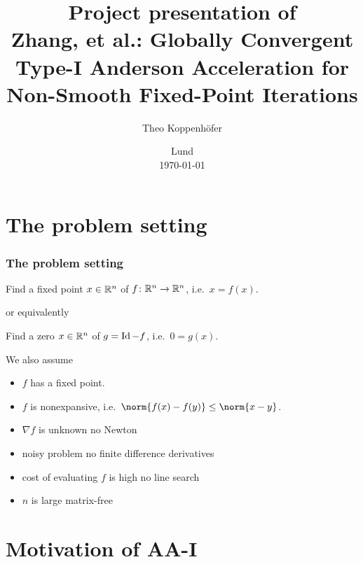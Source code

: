 %




\subject{, VT23}
\title{Project presentation of \\[1ex]
{\large Zhang, et al.: Globally Convergent Type-I Anderson Acceleration for Non-Smooth Fixed-Point Iterations}}
\author{Theo Koppenhöfer}
\date{Lund \\[1ex] \today}











\frame[plain]{\titlepage}


\section{The problem setting}
\begin{frame}
	\frametitle{The problem setting}
	\begin{problem}
		Find a fixed point $x\in\mathbb{R}^n$ of $f\colon\mathbb{R}^n\to\mathbb{R}^n$, i.e.\ $x=f(x)$.
	\end{problem}
	or equivalently
	\begin{problem}
		Find a zero $x\in\mathbb{R}^n$ of $g=\operatorname{Id}-f$, i.e.\ $0=g(x)$.
	\end{problem}
	We also assume
	\begin{itemize}
		\item $f$ has a fixed point.
		\item $f$ is nonexpansive, i.e.\ $\norm{f(x)-f(y)}\leq\norm{x-y}$.
		\item $\nabla f$ is unknown \textrightarrow no Newton
		\item noisy problem \textrightarrow no finite difference derivatives
		\item cost of evaluating $f$ is high \textrightarrow no line search
		\item $n$ is large \textrightarrow matrix-free
	\end{itemize}
\end{frame}

\section{Motivation of AA-I}
